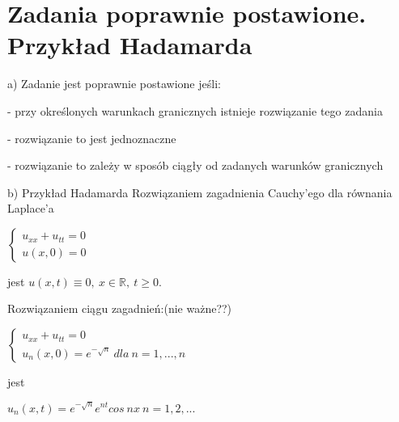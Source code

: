 \section{Zadania poprawnie postawione. Przykład Hadamarda}

a) Zadanie jest poprawnie postawione jeśli:

  - przy określonych warunkach granicznych istnieje rozwiązanie tego zadania
  
  - rozwiązanie to jest jednoznaczne

  - rozwiązanie to zależy w sposób ciągły od zadanych warunków granicznych

b) Przykład Hadamarda
Rozwiązaniem zagadnienia Cauchy'ego dla równania Laplace'a

$\left\{\begin{matrix} u_{xx} + u_{tt} = 0 \\ u(x,0) = 0 \end{matrix}\right.$

jest $u(x,t) \equiv 0,\ x \in \mathbb{R},\ t \geqslant 0$.

Rozwiązaniem ciągu zagadnień:(nie ważne??)

$\left\{\begin{matrix} u_{xx} + u_{tt} = 0 \\ u_n(x,0) = e^{-\sqrt{n}}\ dla\ n = 1, ..., n \end{matrix}\right.$

jest

$u_n(x,t) = e^{-\sqrt{n}}e^{nt}cos\ nx\  n = 1, 2, ...$



